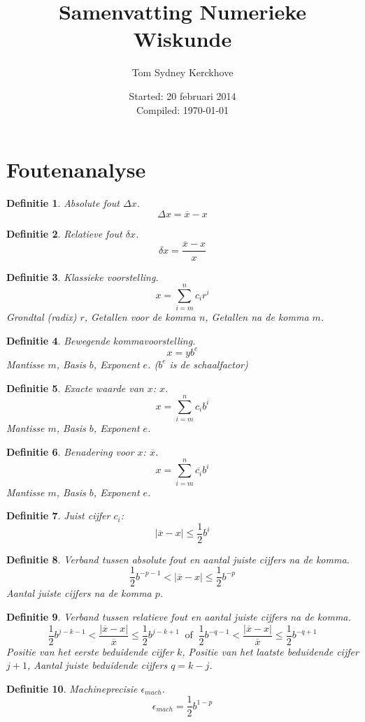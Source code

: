 \documentclass[12pt,a4paper]{article}
\author{Tom Sydney Kerckhove}
\date{Started: 20 februari 2014\\Compiled: \today}
\title{Samenvatting Numerieke Wiskunde}
\newtheorem{defi}{Definitie}
\begin{document}
\maketitle
\newpage

\section{Foutenanalyse}
\begin{defi}
Absolute fout $\Delta x$.
\[
\Delta x = \overline{x} - x
\]
\end{defi}
\begin{defi}
Relatieve fout $\delta x$.
\[
\delta x = \frac{\overline{x} - x}{x}
\]
\end{defi}
\begin{defi}
Klassieke voorstelling.
\[
x = \sum_{i=m}^nc_{i}r^{i}
\]
Grondtal (radix) $r$, Getallen voor de komma $n$, Getallen na de komma $m$.
\end{defi}
\begin{defi}
Bewegende kommavoorstelling.
\[
x = yb^e
\]
Mantisse $m$, Basis $b$, Exponent $e$. ($b^e$ is de schaalfactor)
\end{defi}
\begin{defi}
Exacte waarde van $x$: $x$.
\[
x = \sum_{i=m}^nc_{i}b^{i}
\]
Mantisse $m$, Basis $b$, Exponent $e$.
\end{defi}
\begin{defi}
Benadering voor $x$: $\overline{x}$.
\[
x = \sum_{i=m}^n\overline{c_{i}}b^{i}
\]
Mantisse $m$, Basis $b$, Exponent $e$.
\end{defi}
\begin{defi}
Juist cijfer $c_i$:
\[
|\overline{x}-x| \le \frac{1}{2}b^i
\]
\end{defi}
\begin{defi}
Verband tussen absolute fout en aantal juiste cijfers na de komma.
\[
\frac{1}{2}b^{-p-1} < |\overline{x}-x| \le \frac{1}{2}b^{-p}
\]
Aantal juiste cijfers na de komma $p$.
\end{defi}
\begin{defi}
Verband tussen relatieve fout en aantal juiste cijfers na de komma.
\[
\frac{1}{2}b^{j-k-1} < \frac{|\overline{x}-x|}{\overline{x}} \le \frac{1}{2}b^{j-k+1}
\ \text{ of }\ 
\frac{1}{2}b^{-q-1} < \frac{|\overline{x}-x|}{\overline{x}} \le \frac{1}{2}b^{-q+1}
\]
Positie van het eerste beduidende cijfer $k$, Positie van het laatste beduidende cijfer $j+1$, Aantal juiste beduidende cijfers $q=k-j$.
\end{defi}
\begin{defi}
Machineprecisie $\epsilon_{mach}$.
\[
\epsilon_{mach} = \frac{1}{2}b^{1-p}
\]
\end{defi}
\end{document}
